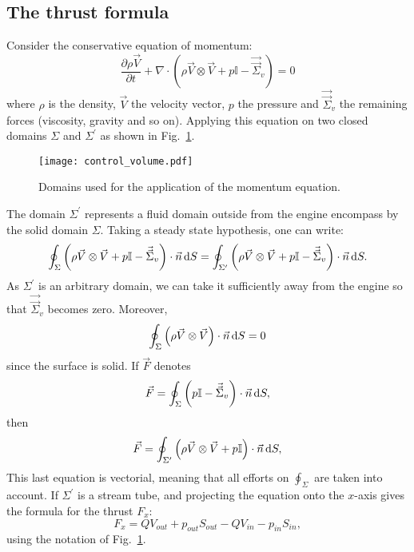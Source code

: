 
\subsection{The thrust formula}
\label{sub:cror_thrust}

Consider the conservative equation of momentum:
\begin{equation}
	\frac{\partial \rho \vec{V}}{\partial t} 
	+ \nabla \cdot (\rho \vec{V} \otimes \vec{V} + p \mathbb{I} - \vec{\vec{\Sigma}}_v) = 0
\end{equation}
where $\rho$ is the density, $\vec{V}$ the velocity vector, $p$ the pressure and
$\vec{\vec{\Sigma}}_v$ the remaining forces (viscosity, gravity and so on).
Applying this equation on two closed domains $\Sigma$ and $\Sigma^\prime$ as
shown in Fig.~\ref{fig:cror_control_volume}.
\begin{figure}[htb]
  \centering
  \texttt{[image: control\_volume.pdf]}
  \caption{Domains used for the application of the momentum equation.}
  \label{fig:cror_control_volume}
\end{figure}
The domain $\Sigma^\prime$ represents a fluid domain outside from the
engine encompass by the solid domain $\Sigma$.
Taking a steady state hypothesis, one can write:
\begin{equation}
	\oint_{\Sigma} \left(\rho \vec{V} \otimes \vec{V} + 
	                       p \mathbb{I} - 
	                       \vec{\vec{\Sigma}}_v \right) \cdot \vec{n} \mathop{}\!\mathrm{d} S
    =
   	\oint_{\Sigma^\prime} \left(\rho \vec{V} \otimes \vec{V} + 
	                       p \mathbb{I} - 
	                       \vec{\vec{\Sigma}}_v \right) \cdot \vec{n} \mathop{}\!\mathrm{d} S.
\end{equation} 
As $\Sigma^\prime$ is an arbitrary domain, we can take it sufficiently
away from the engine so that $\vec{\vec{\Sigma}}_v$ becomes zero.
Moreover, 
\begin{equation}
	\oint_{\Sigma} \left(\rho \vec{V} \otimes \vec{V} \right) \cdot \vec{n} \mathop{}\!\mathrm{d} S = 0
\end{equation}
since the surface is solid. If $\vec{F}$ denotes
\begin{equation}
	\vec{F} = \oint_{\Sigma} \left(p \mathbb{I} - 
	\vec{\vec{\Sigma}}_v \right) \cdot \vec{n} \mathop{}\!\mathrm{d} S,
\end{equation}
then
\begin{equation}
	\vec{F} = \oint_{\Sigma^\prime} \left(\rho \vec{V} \otimes \vec{V} +
	p \mathbb{I} \right) \cdot \vec{n} \mathop{}\!\mathrm{d} S,
\end{equation}
This last equation is vectorial, meaning that all efforts on 
$\oint_{\Sigma}$ are taken into account.
If $\Sigma^\prime$ is a stream tube, and projecting the equation
onto the $x$-axis gives the formula for the thrust $F_x$:
\begin{equation}
	F_x = Q V_{out} + p_{out} S_{out}
	- Q V_{in} - p_{in} S_{in},
\end{equation}
using the notation of Fig.~\ref{fig:cror_control_volume}.

